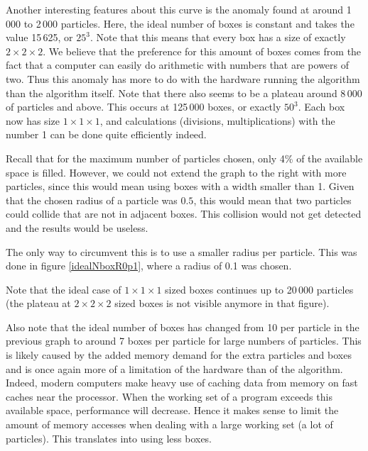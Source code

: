 Another interesting features about this curve is the anomaly found at 
around 1\,000 to 2\,000 particles. Here, the ideal number of boxes is 
constant and takes the value 15\,625, or $25^3$. Note that this means that 
every box has a size of exactly $2 \times 2 \times 2$. We believe that the 
preference for this amount of boxes comes from the fact that a computer can 
easily do arithmetic with numbers that are powers of two. Thus this anomaly 
has more to do with the hardware running the algorithm than the algorithm 
itself. Note that there also seems to be a plateau around 8\,000 of particles 
and above. This occurs at 125\,000 boxes, or exactly $50^3$. Each box now has 
size $1 \times 1 \times 1$, and calculations (divisions, multiplications) with 
the number 1 can be done quite efficiently indeed.

Recall that for the maximum number of particles chosen, only 4\% of the 
available space is filled. However, we could not extend the graph to the 
right with more particles, since this would mean using boxes with a width 
smaller than 1. Given that the chosen radius of a particle was $0.5$, this 
would mean that two particles could collide that are not in adjacent boxes.  
This collision would not get detected and the results would be useless.

The only way to circumvent this is to use a smaller radius per particle.  
This was done in figure \ref{idealNboxR0p1}, where a radius of 0.1 was 
chosen.



Note that the ideal case of $1 \times 1 \times 1$ sized boxes continues up 
to 20\,000 particles (the plateau at $2 \times 2 \times 2$ sized boxes is 
not visible anymore in that figure).

Also note that the ideal number of boxes has changed from 10 per particle 
in the previous graph to around 7 boxes per particle for large numbers of 
particles. This is likely caused by the added memory demand for the extra 
particles and boxes and is once again more of a limitation of the hardware 
than of the algorithm. Indeed, modern computers make heavy use of caching 
data from memory on fast caches near the processor. When the working set of a 
program exceeds this available space, performance will decrease. Hence it makes 
sense to limit the amount of memory accesses when dealing with a large working 
set (a lot of particles). This translates into using less boxes.

